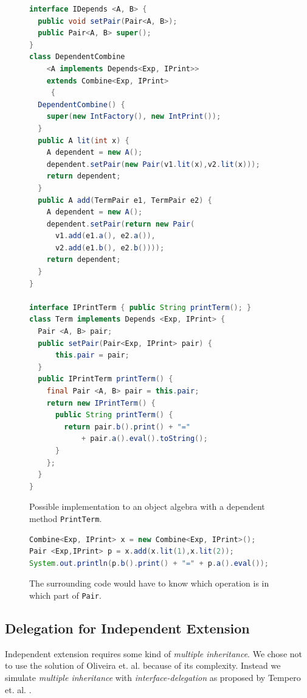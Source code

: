 \documentclass{report}
\begin{document}
\begin{figure}[H]
\begin{lstlisting}[language=java]
interface IDepends <A, B> {
  public void setPair(Pair<A, B>);
  public Pair<A, B> super();
}
class DependentCombine
    <A implements Depends<Exp, IPrint>>
    extends Combine<Exp, IPrint>
     {
  DependentCombine() {
    super(new IntFactory(), new IntPrint());
  }
  public A lit(int x) {
    A dependent = new A();
    dependent.setPair(new Pair(v1.lit(x),v2.lit(x)));
    return dependent;
  }
  public A add(TermPair e1, TermPair e2) {
    A dependent = new A();
    dependent.setPair(return new Pair(
      v1.add(e1.a(), e2.a()),
      v2.add(e1.b(), e2.b())));
    return dependent;
  }
}

interface IPrintTerm { public String printTerm(); }
class Term implements Depends <Exp, IPrint> {
  Pair <A, B> pair;
  public setPair(Pair<Exp, IPrint> pair) {
      this.pair = pair;
  }
  public IPrintTerm printTerm() {
    final Pair <A, B> pair = this.pair;
    return new IPrintTerm() {
      public String printTerm() {
        return pair.b().print() + "="
            + pair.a().eval().toString();
      }
    };
  }
}

\end{lstlisting}
\caption{Possible implementation to an object algebra with a dependent method \lstinline{PrintTerm}.}
\label{dependentPrintTerm}
\end{figure}


\begin{figure}[H]
\begin{lstlisting}[language=java]
Combine<Exp, IPrint> x = new Combine<Exp, IPrint>();
Pair <Exp,IPrint> p = x.add(x.lit(1),x.lit(2));
System.out.println(p.b().print() + "=" + p.a().eval());
\end{lstlisting}
\caption{The surrounding code would have to know which operation is in which part of \lstinline{Pair}.}
\label{combineExampleSurrounding}
\end{figure}



\subsection{Delegation for Independent Extension}

Independent extension requires some kind of \emph{multiple inheritance}. We chose not to use the solution of Oliveira et. al. because of its complexity. Instead we simulate \emph{multiple inheritance} with \emph{interface-delegation} as proposed by Tempero et. al. \cite{Tempero-Multiple-2000}.
\end{document}
